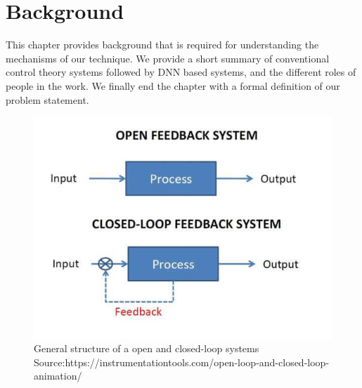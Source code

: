 \chapter{Background}
\label{ch:Chapter2}

This chapter provides background that is required for understanding the mechanisms of our technique. We provide a short summary of conventional control theory systems followed by DNN based systems, and the different roles of people in the work. We finally end the chapter with a formal definition of our problem statement. 

\begin{figure}
	\centering
	\includegraphics[width=0.7\linewidth]{Images/closedvsopen}
	\caption{General structure of a open and closed-loop systems 
	             Source:https://instrumentationtools.com/open-loop-and-closed-loop-animation/ }
	\label{fig:closedvsopen}
\end{figure}


